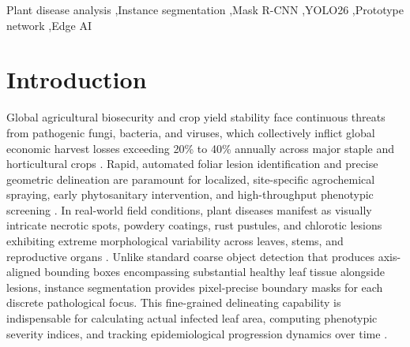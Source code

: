 \documentclass[5p,times]{elsarticle}
\begin{document}
\begin{frontmatter}
\begin{keyword}
Plant disease analysis \sep Instance segmentation \sep Mask R-CNN \sep YOLO26 \sep Prototype network \sep Edge AI
\end{keyword}

\end{frontmatter}

\section{Introduction}
\label{sec:intro}
Global agricultural biosecurity and crop yield stability face continuous threats from pathogenic fungi, bacteria, and viruses, which collectively inflict global economic harvest losses exceeding 20\% to 40\% annually across major staple and horticultural crops \cite{savary2019global, barbedo2020review}. Rapid, automated foliar lesion identification and precise geometric delineation are paramount for localized, site-specific agrochemical spraying, early phytosanitary intervention, and high-throughput phenotypic screening \cite{kamilaris2018deep, wang2017automatic}. In real-world field conditions, plant diseases manifest as visually intricate necrotic spots, powdery coatings, rust pustules, and chlorotic lesions exhibiting extreme morphological variability across leaves, stems, and reproductive organs \cite{wang2026c2bpnet, li2025lightweight}. Unlike standard coarse object detection that produces axis-aligned bounding boxes encompassing substantial healthy leaf tissue alongside lesions, instance segmentation provides pixel-precise boundary masks for each discrete pathological focus. This fine-grained delineating capability is indispensable for calculating actual infected leaf area, computing phenotypic severity indices, and tracking epidemiological progression dynamics over time \cite{ismail2026explainable, liu2026releaf, zhang2026segmenting}.
\end{document}
